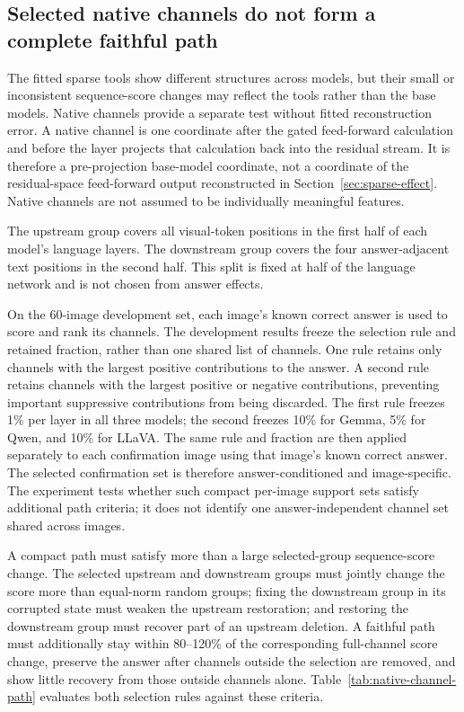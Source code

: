 \subsection{Selected native channels do not form a complete faithful path}
\label{sec:native-path}

The fitted sparse tools show different structures across models, but their small or inconsistent sequence-score changes may reflect the tools rather than the base models. Native channels provide a separate test without fitted reconstruction error. A native channel is one coordinate after the gated feed-forward calculation and before the layer projects that calculation back into the residual stream. It is therefore a pre-projection base-model coordinate, not a coordinate of the residual-space feed-forward output reconstructed in Section~\ref{sec:sparse-effect}. Native channels are not assumed to be individually meaningful features.

The upstream group covers all visual-token positions in the first half of each model's language layers. The downstream group covers the four answer-adjacent text positions in the second half. This split is fixed at half of the language network and is not chosen from answer effects.

On the 60-image development set, each image's known correct answer is used to score and rank its channels. The development results freeze the selection rule and retained fraction, rather than one shared list of channels. One rule retains only channels with the largest positive contributions to the answer. A second rule retains channels with the largest positive or negative contributions, preventing important suppressive contributions from being discarded. The first rule freezes 1\% per layer in all three models; the second freezes 10\% for Gemma, 5\% for Qwen, and 10\% for LLaVA. The same rule and fraction are then applied separately to each confirmation image using that image's known correct answer. The selected confirmation set is therefore answer-conditioned and image-specific. The experiment tests whether such compact per-image support sets satisfy additional path criteria; it does not identify one answer-independent channel set shared across images.

A compact path must satisfy more than a large selected-group sequence-score change. The selected upstream and downstream groups must jointly change the score more than equal-norm random groups; fixing the downstream group in its corrupted state must weaken the upstream restoration; and restoring the downstream group must recover part of an upstream deletion. A faithful path must additionally stay within 80--120\% of the corresponding full-channel score change, preserve the answer after channels outside the selection are removed, and show little recovery from those outside channels alone. Table~\ref{tab:native-channel-path} evaluates both selection rules against these criteria.

